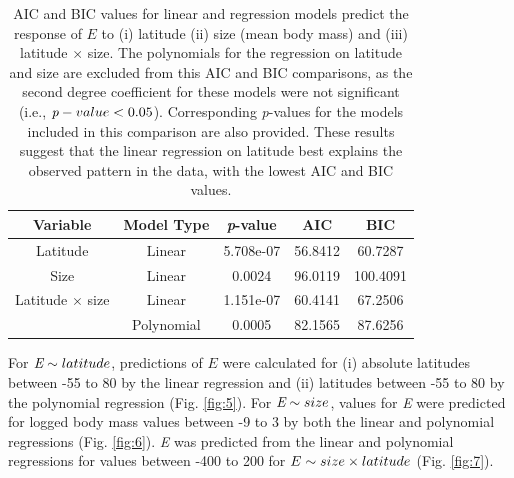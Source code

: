\documentclass[11pt]{article}
\begin{document}
\begin{flushleft}
\begin{table}[!htbp]
\centering
 \begin{tabular}{||c c c c c||} 
 \hline
 Variable & Model Type & \emph{p}-value & AIC & BIC \\ [0.5ex] 
 \hline\hline
 Latitude & Linear & 5.708e-07 & 56.8412 & 60.7287 \\ 
 Size & Linear & 0.0024 & 96.0119 & 100.4091 \\
 Latitude $\times$ size & Linear & 1.151e-07 & 60.4141 & 67.2506 \\ 
  & Polynomial & 0.0005 & 82.1565 & 87.6256 \\ [2ex] 
 \hline
 \end{tabular}
 \caption{\label{table:2} AIC and BIC values for linear and regression models predict the response of \emph{$E$} to (i) latitude (ii) size (mean body mass) and (iii) latitude $\times$ size. The polynomials for the regression on latitude and size are excluded from this AIC and BIC comparisons, as the second degree coefficient for these models were not significant (i.e., $\emph{p}-value < 0.05$). Corresponding \emph{p}-values for the models included in this comparison are also provided. These results suggest that the linear regression on latitude best explains the observed pattern in the data, with the lowest AIC and BIC values.}
\end{table}

For $\emph{E} \sim latitude$, predictions of \emph{$E$} were calculated for (i) absolute latitudes between -55 to 80 by the linear regression and (ii) latitudes between -55 to 80 by the polynomial regression (Fig. \ref{fig:5}). For $\emph{E} \sim size$, values for \emph{E} were predicted for logged body mass values between -9 to 3 by both the linear and polynomial regressions (Fig. \ref{fig:6}). \emph{E} was predicted from the linear and polynomial regressions for values between -400 to 200 for $\emph{$E$} \sim size \times latitude$ (Fig. \ref{fig:7}).
\linebreak 
\linebreak


\end{flushleft}
\end{document}
